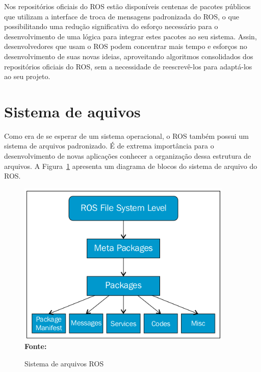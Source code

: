 Nos repositórios oficiais do ROS estão disponíveis centenas de pacotes públicos que utilizam a interface de troca de mensagens padronizada do ROS, o que possibilitando uma redução significativa do esforço necessário para o desenvolvimento de uma lógica para integrar estes pacotes ao seu sistema. Assin, desenvolvedores que usam o ROS podem concentrar mais tempo e esforços no desenvolvimento de suas novas ideias, aproveitando algoritmos consolidados dos repositórios oficiais do ROS, sem a necessidade de reescrevê-los para adaptá-los ao seu projeto.


\section{Sistema de aquivos}
Como era de se esperar de um sistema operacional, o ROS também possui um sistema de arquivos padronizado. É de extrema importância para o desenvolvimento de novas aplicações conhecer a organização dessa estrutura de arquivos. A Figura~\ref{fig:rosfile} apresenta um diagrama de blocos do sistema de arquivo do ROS\@.

\begin{figure}[ht]
	\caption{Sistema de arquivos ROS}
	\begin{center}
		\includegraphics[scale=0.7]{imagens/fileSiystem.png}\\
		{\small \textbf{Fonte:} }
    \end{center}\label{fig:rosfile}
\end{figure}

